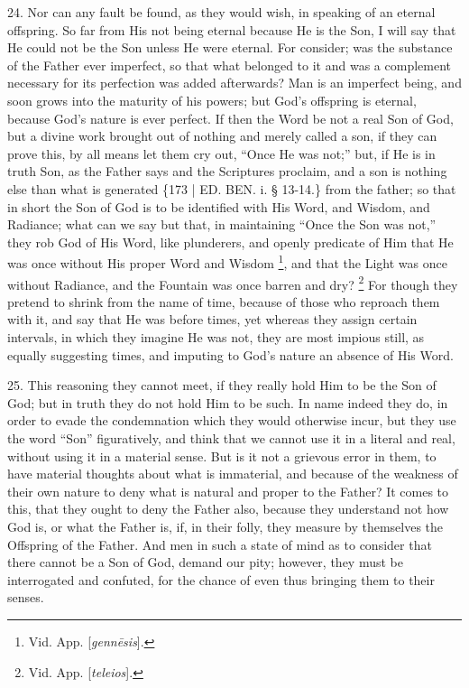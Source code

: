 24. Nor can any fault be
found, as they would wish, in speaking of an eternal offspring. So far
from His not being eternal because He is the Son, I will say that He
could not be the Son unless He were eternal. For consider; was the
substance of the Father ever imperfect, so that what belonged to it
and was a complement necessary for its perfection was added
afterwards? Man is an imperfect being, and soon grows into the
maturity of his powers; but God's offspring is eternal, because God's
nature is ever perfect. If then the Word be not a real Son of God, but
a divine work brought out of nothing and merely called a son, if they
can prove this, by all means let them cry out, ``Once He was not;'' but,
if He is in truth Son, as the Father says and the Scriptures proclaim,
and a son is nothing else than what is generated \{173 | ED. BEN. i. § 13-14.\}
from the father; so that in short the Son of God is to be identified
with His Word, and Wisdom, and Radiance; what can we say but that, in
maintaining ``Once the Son was not,'' they rob God of His Word, like
plunderers, and openly predicate of Him that He was once without His
proper Word and Wisdom \footnote{Vid. App. [\emph{genn\={e}sis}].},
and that the Light was once without Radiance, and the Fountain was
once barren and dry? \footnote{Vid. App. [\emph{teleios}].}
For though they pretend to shrink from the name of time, because of
those who reproach them with it, and say that He was before times, yet
whereas they assign certain intervals, in which they imagine He was
not, they are most impious still, as equally suggesting times, and
imputing to God's nature an absence of His Word.

25. This reasoning they cannot
meet, if they really hold Him to be the Son of God; but in truth they
do not hold Him to be such. In name indeed they do, in order to evade
the condemnation which they would otherwise incur, but they use the
word ``Son'' figuratively, and think that we cannot use it in a literal
and real, without using it in a material sense. But is it not a
grievous error in them, to have material thoughts about what is
immaterial, and because of the weakness of their own nature to deny
what is natural and proper to the Father? It comes to this, that they
ought to deny the Father also, because they understand not how God is,
or what the Father is, if, in their folly, they measure by themselves
the Offspring of the Father. And men in such a state of mind as to
consider that there cannot be a Son of God, demand our pity; however,
they must be interrogated and confuted, for the chance of even thus
bringing them to their senses.

